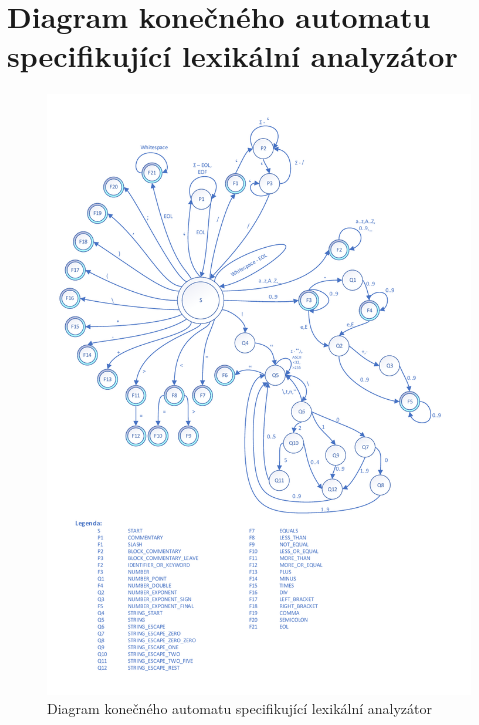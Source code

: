 \documentclass[a4paper, 11pt]{article}
\begin{document}
	\section{Diagram konečného automatu specifikující lexikální analyzátor}
	\begin{figure}[!ht]
		\centering
		\vspace{-1.2cm}
		\includegraphics[width=0.95\linewidth]{inc/FA_graph.pdf}
		\caption{Diagram konečného automatu specifikující lexikální analyzátor}
		\label{figure:fa_graph}
	\end{figure}
\end{document}
